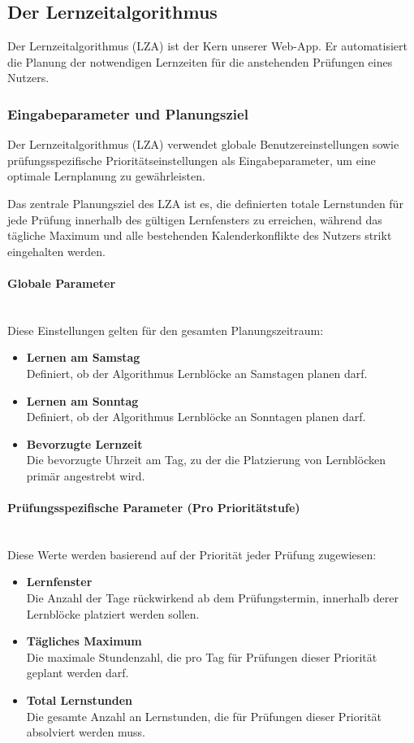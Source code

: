 \documentclass[12pt,a4paper]{report}
\newcommand{\myparagraph}[1]{\paragraph{#1}\mbox{}\\}
\begin{document}
\subsection{Der Lernzeitalgorithmus}
Der Lernzeitalgorithmus (LZA) ist der Kern unserer Web-App. Er automatisiert die Planung der notwendigen Lernzeiten für die anstehenden Prüfungen eines Nutzers.

\subsubsection{Eingabeparameter und Planungsziel}

Der Lernzeitalgorithmus (LZA) verwendet globale Benutzereinstellungen sowie prüfungsspezifische Prioritätseinstellungen als Eingabeparameter, um eine optimale Lernplanung zu gewährleisten.

Das zentrale Planungsziel des LZA ist es, die definierten totale Lernstunden für jede Prüfung innerhalb des gültigen Lernfensters zu erreichen, während das tägliche Maximum und alle bestehenden Kalenderkonflikte des Nutzers strikt eingehalten werden.

\myparagraph{Globale Parameter}
Diese Einstellungen gelten für den gesamten Planungszeitraum:
\begin{itemize}
    \item \textbf{Lernen am Samstag}\\
    Definiert, ob der Algorithmus Lernblöcke an Samstagen planen darf.
    \item \textbf{Lernen am Sonntag}\\
    Definiert, ob der Algorithmus Lernblöcke an Sonntagen planen darf.
    \item \textbf{Bevorzugte Lernzeit}\\
    Die bevorzugte Uhrzeit am Tag, zu der die Platzierung von Lernblöcken primär angestrebt wird.
\end{itemize}

\myparagraph{Prüfungsspezifische Parameter (Pro Prioritätstufe)}
Diese Werte werden basierend auf der Priorität jeder Prüfung zugewiesen:
\begin{itemize}
    \item \textbf{Lernfenster}\\
    Die Anzahl der Tage rückwirkend ab dem Prüfungstermin, innerhalb derer Lernblöcke platziert werden sollen.
    \item \textbf{Tägliches Maximum}\\
    Die maximale Stundenzahl, die pro Tag für Prüfungen dieser Priorität geplant werden darf.
    \item \textbf{Total Lernstunden}\\
    Die gesamte Anzahl an Lernstunden, die für Prüfungen dieser Priorität absolviert werden muss.
\end{itemize}
\end{document}
